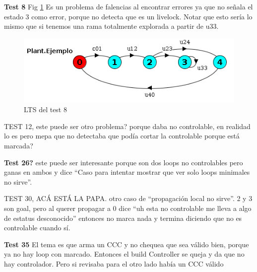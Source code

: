 
\smallskip
\textbf{Test 8} Fig \ref{fig:test8} Es un problema de falencias al encontrar errores ya que no señala el estado 3 como error, porque no detecta que es un livelock. Notar que esto sería lo mismo que si tenemos una rama totalmente explorada a partir de u33.
\begin{figure}
 \centering
 \includegraphics[scale=0.7]{figures/tests/test8.png}
 \caption{LTS del test 8}
 \label{fig:test8}
\end{figure}

TEST 12, este puede ser otro problema? porque daba no controlable, en realidad lo es pero mepa que no detectaba que podía cortar la controlable porque está marcada?

\smallskip
\textbf{Test 26?} este puede ser interesante porque son dos loops no controlables pero ganas en ambos y dice ``Caso para intentar mostrar que ver solo loops minimales no sirve''. %

TEST 30, ACÁ ESTÁ LA PAPA. otro caso de ``propagación local no sirve''. 2 y 3 son goal, pero al querer propagar a 0 dice ``uh esta no controlable me lleva a algo de estatus desconocido'' entonces no marca nada y termina diciendo que no es controlable cuando sí. %

\smallskip
\textbf{Test 35} El tema es que arma un CCC y no chequea que sea válido bien, porque ya no hay loop con marcado. Entonces el build Controller se queja y da que no hay controlador. Pero si revisaba para el otro lado había un CCC válido

